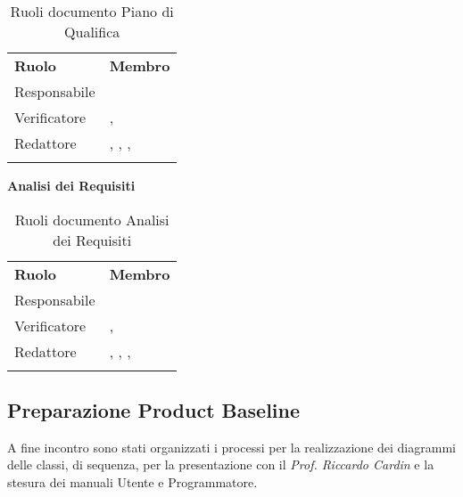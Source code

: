 \begin{center}
		\renewcommand{\arraystretch}{1.5}
		\begin{longtable}{  p{2.5cm} p{4cm} }
			\rowcolor{tableHeadYellow}
			\textbf{Ruolo}&\textbf{Membro}\\
			Responsabile & \alessandro \\
			Verificatore & \mbox{\matteo}, \mbox{\alberto} \\
			Redattore & \mbox{\sonia}, \mbox{\andrea}, \mbox{\luca}, \mbox{\pardeep} \\
			\rowcolor{white}
			\caption{Ruoli documento Piano di Qualifica}
			\label{sec:tabella5}
		\end{longtable}	
		\textbf{Analisi dei Requisiti}
		\renewcommand{\arraystretch}{1.5}
		\begin{longtable}{  p{2.5cm} p{4cm} }
			\rowcolor{tableHeadYellow}
			\textbf{Ruolo}&\textbf{Membro}\\
			Responsabile & \alessandro \\
			Verificatore & \mbox{\andrea}, \mbox{\pardeep} \\
			Redattore & \mbox{\matteo}, \mbox{\luca}, \mbox{\alessandro}, \mbox{\sonia} \\
			\rowcolor{white}
			\caption{Ruoli documento Analisi dei Requisiti}
			\label{sec:tabella6}
		\end{longtable}	
	\end{center}
\subsection{Preparazione Product Baseline}
\label{sec:presentazione_pb}
A fine incontro sono stati organizzati i processi per la realizzazione dei diagrammi delle classi, di sequenza, per la presentazione con il \textit{Prof. Riccardo Cardin} e la stesura dei manuali Utente e Programmatore.